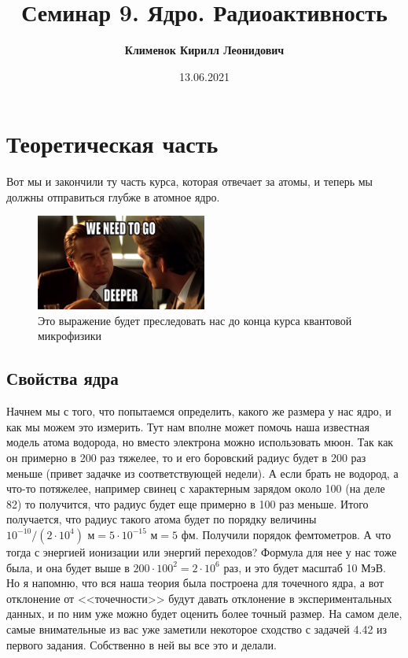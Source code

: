 \documentclass[12pt]{article}
\begin{document}
 
\title{\textbf{Семинар 9. Ядро. Радиоактивность }}
\author{\textbf{Клименок Кирилл Леонидович}}
\date{13.06.2021}
\maketitle
\section{Теоретическая часть}
Вот мы и закончили ту часть курса, которая отвечает за атомы, и теперь мы должны отправиться глубже в атомное ядро.
\begin{figure}[h]
    \centering
    \includegraphics[width=0.5\textwidth,height=\textheight,keepaspectratio]{Seminar_09/pics/pic_deeper.jpg}
    \caption{Это выражение будет преследовать нас до конца курса квантовой микрофизики}
\end{figure}
\subsection{Свойства ядра}

Начнем мы с того, что попытаемся определить, какого же размера у нас ядро, и как мы можем это измерить. Тут нам вполне может помочь наша известная модель атома водорода, но вместо электрона можно использовать мюон. Так как он примерно в 200 раз тяжелее, то и его боровский радиус будет в 200 раз меньше (привет задачке из соответствующей недели). А если брать не водород, а что-то потяжелее, например свинец с характерным зарядом около 100 (на деле 82) то получится, что радиус будет еще примерно в 100 раз меньше. Итого получается, что радиус такого атома будет по порядку величины $10^{-10}/(2\cdot 10^{4}) \text{ м} =5\cdot 10^{-15} \text{ м} = 5 \text{ фм}$. Получили порядок фемтометров. А что тогда с энергией ионизации или энергий переходов? Формула для нее у нас тоже была, и она будет выше в $200\cdot 100^2 = 2\cdot 10^6$ раз, и это будет масштаб 10 МэВ. Но я напомню, что вся наша теория была построена для точечного ядра, а вот отклонение от <<точечности>> будут давать отклонение в экспериментальных данных, и по ним уже можно будет оценить более точный размер. На самом деле, самые внимательные из вас уже заметили некоторое сходство с задачей 4.42 из первого задания. Собственно в ней вы все это и делали. 
\end{document}
